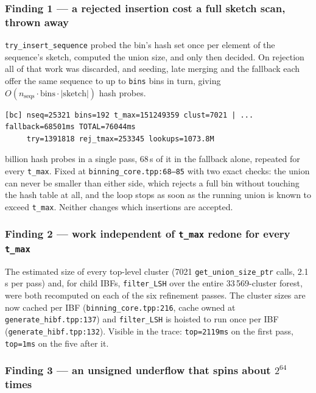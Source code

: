 \documentclass[11pt,a4paper]{article}
\newcommand{\code}[1]{\lstinline[basicstyle=\ttfamily\small]!#1!}
\begin{document}
\subsubsection*{Finding 1 --- a rejected insertion cost a full sketch scan, thrown away}

\code{try_insert_sequence} probed the bin's hash set once per element of the sequence's sketch,
computed the union size, and only then decided. On rejection all of that work was discarded, and
seeding, late merging and the fallback each offer the same sequence to up to \code{bins} bins in
turn, giving $O(n_{\text{seqs}} \cdot \text{bins} \cdot |\text{sketch}|)$ hash probes.

\begin{lstlisting}[style=codestyle,caption={One root binning pass, before the fix}]
[bc] nseq=25321 bins=192 t_max=151249359 clust=7021 | ... fallback=68501ms TOTAL=76044ms
     try=1391818 rej_tmax=253345 lookups=1073.8M
\end{lstlisting}

 billion hash probes in a single pass, 68\,s of it in the fallback alone, repeated
for every \code{t_max}. Fixed at \texttt{binning\_core.tpp:68--85} with two exact checks: the union
can never be smaller than either side, which rejects a full bin without touching the hash table at
all, and the loop stops as soon as the running union is known to exceed \code{t_max}. Neither
changes which insertions are accepted.

\subsubsection*{Finding 2 --- work independent of \texttt{t\_max} redone for every \texttt{t\_max}}

The estimated size of every top-level cluster (7021 \code{get_union_size_ptr} calls, 2.1\,s per
pass) and, for child IBFs, \code{filter_LSH} over the entire 33\,569-cluster forest, were both
recomputed on each of the six refinement passes. The cluster sizes are now cached per IBF
(\texttt{binning\_core.tpp:216}, cache owned at \texttt{generate\_hibf.tpp:137}) and
\code{filter_LSH} is hoisted to run once per IBF (\texttt{generate\_hibf.tpp:132}). Visible in the
trace: \texttt{top=2119ms} on the first pass, \texttt{top=1ms} on the five after it.

\subsubsection*{Finding 3 --- an unsigned underflow that spins about $2^{64}$ times}
\end{document}
